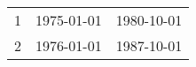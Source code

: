 % 
\begin{tabular}{ccc}
  \hline
  \hline
1 & 1975-01-01 & 1980-10-01 \\ 
  2 & 1976-01-01 & 1987-10-01 \\ 
   \hline
\end{tabular}
